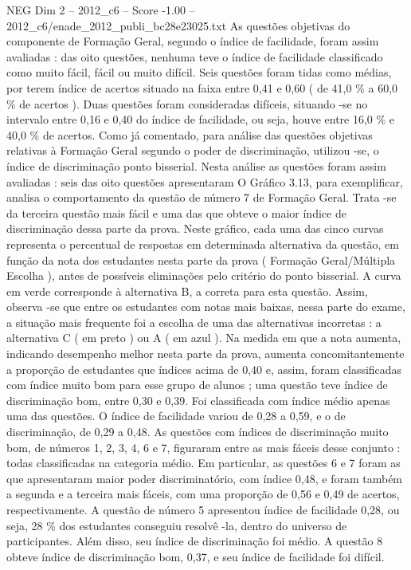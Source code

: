 \begin{textsample}{NEG Dim 2 – 2012\_c6 – Score -1.00 – 2012\_c6/enade\_2012\_publi\_bc28e23025.txt}
As questões objetivas do componente de Formação Geral, segundo o índice de facilidade, foram assim avaliadas : das oito questões, nenhuma teve o índice de facilidade classificado como muito fácil, fácil ou muito difícil.
Seis questões foram tidas como médias, por terem índice de acertos situado na faixa entre 0,41 e 0,60 ( de 41,0 \% a 60,0 \% de acertos ).
Duas questões foram consideradas difíceis, situando -se no intervalo entre 0,16 e 0,40 do índice de facilidade, ou seja, houve entre 16,0 \% e 40,0 \% de acertos.
Como já comentado, para análise das questões objetivas relativas à Formação Geral segundo o poder de discriminação, utilizou -se, o índice de discriminação ponto bisserial.
Nesta análise as questões foram assim avaliadas : seis das oito questões apresentaram O Gráfico 3.13, para exemplificar, analisa o comportamento da questão de número 7 de Formação Geral.
Trata -se da terceira questão mais fácil e uma das que obteve o maior índice de discriminação dessa parte da prova.
Neste gráfico, cada uma das cinco curvas representa o percentual de respostas em determinada alternativa da questão, em função da nota dos estudantes nesta parte da prova ( Formação Geral/Múltipla Escolha ), antes de possíveis eliminações pelo critério do ponto bisserial.
A curva em verde corresponde à alternativa B, a correta para esta questão.
Assim, observa -se que entre os estudantes com notas mais baixas, nessa parte do exame, a situação mais frequente foi a escolha de uma das alternativas incorretas : a alternativa C ( em preto ) ou A ( em azul ).
Na medida em que a nota aumenta, indicando desempenho melhor nesta parte da prova, aumenta concomitantemente a proporção de estudantes que índices acima de 0,40 e, assim, foram classificadas com índice muito bom para esse grupo de alunos ; uma questão teve índice de discriminação bom, entre 0,30 e 0,39.
Foi classificada com índice médio apenas uma das questões.
O índice de facilidade variou de 0,28 a 0,59, e o de discriminação, de 0,29 a 0,48.
As questões com índices de discriminação muito bom, de números 1, 2, 3, 4, 6 e 7, figuraram entre as mais fáceis desse conjunto : todas classificadas na categoria médio.
Em particular, as questões 6 e 7 foram as que apresentaram maior poder discriminatório, com índice 0,48, e foram também a segunda e a terceira mais fáceis, com uma proporção de 0,56 e 0,49 de acertos, respectivamente.
A questão de número 5 apresentou índice de facilidade 0,28, ou seja, 28 \% dos estudantes conseguiu resolvê -la, dentro do universo de participantes.
Além disso, seu índice de discriminação foi médio.
A questão 8 obteve índice de discriminação bom, 0,37, e seu índice de facilidade foi difícil.

\end{textsample}
